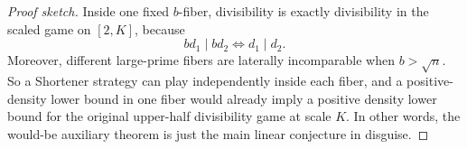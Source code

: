 \begin{proof}[Proof sketch]
Inside one fixed $b$-fiber, divisibility is exactly divisibility in the scaled
game on $[2,K]$, because
\[
bd_1\mid bd_2 \Longleftrightarrow d_1\mid d_2.
\]
Moreover, different large-prime fibers are laterally incomparable when
$b>\sqrt n$.  So a Shortener strategy can play independently inside each fiber,
and a positive-density lower bound in one fiber would already imply a positive
density lower bound for the original upper-half divisibility game at scale $K$.
In other words, the would-be auxiliary theorem is just the main linear
conjecture in disguise.
\end{proof}
